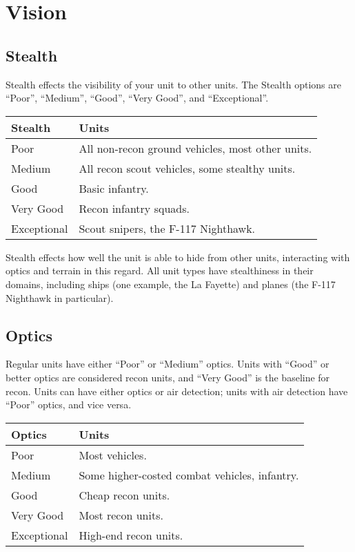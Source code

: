 \documentclass{article}
\begin{document}
\section{Vision}

\subsection{Stealth}

Stealth effects the visibility of your unit to other units. The Stealth options
are ``Poor'', ``Medium'', ``Good'', ``Very Good'', and ``Exceptional''.

\begin{center}
    \begin{tabular}{ | l | l | }
    \hline
    Stealth & Units \\ \hline
    Poor & All non-recon ground vehicles, most other units.  \\ 
    Medium & All recon scout vehicles, some stealthy units.  \\
    Good & Basic infantry. \\
    Very Good & Recon infantry squads. \\
    Exceptional & Scout snipers, the F-117 Nighthawk.\\
    \hline
    \end{tabular}
\end{center}

Stealth effects how well the unit is able to hide from other units, interacting
with optics and terrain in this regard. All unit types have stealthiness in
their domains, including ships (one example, the La Fayette) and planes (the
F-117 Nighthawk in particular).

\subsection{Optics}

Regular units have either ``Poor'' or ``Medium'' optics. Units with ``Good'' or
better optics are considered recon units, and ``Very Good'' is the baseline for
recon. Units can have either optics or air detection; units with air detection
have ``Poor'' optics, and vice versa.

\begin{center}
    \begin{tabular}{ | l | l | }
    \hline
    Optics & Units \\ \hline
    Poor & Most vehicles.\\
    Medium & Some higher-costed combat vehicles, infantry.\\
    Good & Cheap recon units.\\
    Very Good & Most recon units.\\
    Exceptional & High-end recon units.\\
    \hline
    \end{tabular}
\end{center}
\end{document}

